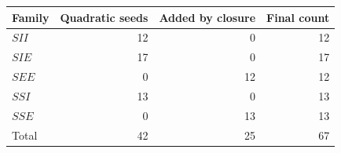 \begin{center}
\begin{tabular}{@{}lrrr@{}}
\toprule
Family & Quadratic seeds & Added by closure & Final count\\
\midrule
$SII$ & 12 & 0 & 12 \\
$SIE$ & 17 & 0 & 17 \\
$SEE$ & 0 & 12 & 12 \\
$SSI$ & 13 & 0 & 13 \\
$SSE$ & 0 & 13 & 13 \\
\midrule
Total & 42 & 25 & 67 \\
\bottomrule
\end{tabular}
\end{center}
